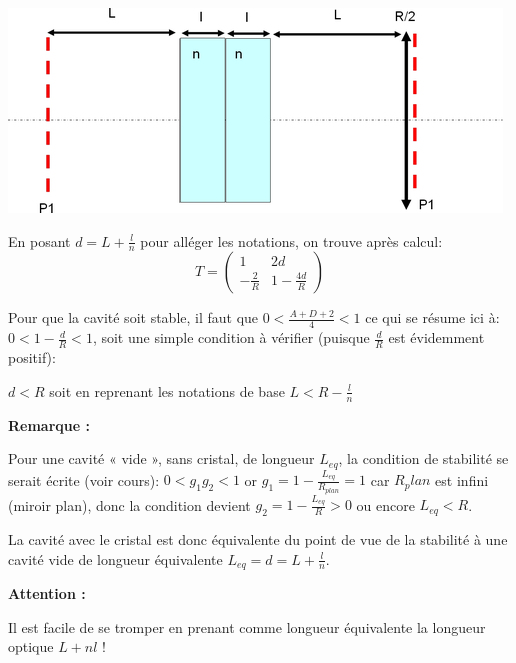 \documentclass{book}
\begin{document}
{\centering
\includegraphics[scale=1.7]{images/EC_Fig3.jpg}
\par}

En posant \(d = L + \frac ln\) pour alléger les notations, on trouve après calcul:
\[T = \begin{pmatrix}
1 & 2d \\
-\frac 2R & 1-\frac {4d}R
\end{pmatrix}\]

Pour que la cavité soit stable, il faut que \(0 < \frac{A+D+2}4 < 1\) ce qui se résume ici à: \(0 < 1-\frac d R < 1\), soit une simple condition à vérifier (puisque \(\frac dR\) est évidemment positif):

\(d < R\) soit en reprenant les notations de base \(L < R-\frac ln\)

\textbf{\color{remarque1}Remarque :}  
\begin{mdframed}[linecolor=remarque1, backgroundcolor=remarque2]

Pour une cavité « vide », sans cristal, de longueur \(L_{eq}\), la condition de stabilité se serait écrite (voir cours): \(0 < g_1g_2 < 1\) or \(g_1=1-\frac {L_{eq}}{R_{plan}}=1\) car \(R_plan\) est infini (miroir plan), donc la condition devient \(g_2=1-\frac{L_{eq}}R > 0\) ou encore \(L_{eq} < R\).

La cavité avec le cristal est donc équivalente du point de vue de la stabilité à une cavité vide de longueur équivalente \(L_{eq}=d=L+\frac ln\).

\end{mdframed}

\textbf{\color{attention1}Attention :}  
\begin{mdframed}[linecolor=attention1, backgroundcolor=attention2]

Il est facile de se tromper en prenant comme longueur équivalente la longueur optique \(L+nl\) !

\end{mdframed}
\end{document}
